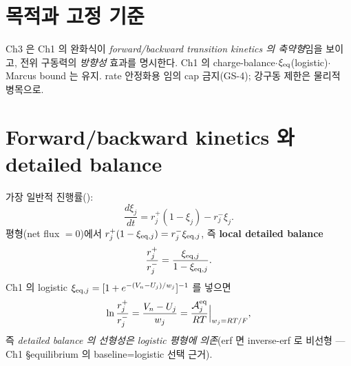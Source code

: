 \section{목적과 고정 기준}\label{sec:ch3_scope}
Ch3 은 Ch1 의 완화식이 \emph{forward/backward transition kinetics 의 축약형}임을 보이고, 전위
구동력의 \emph{방향성} 효과를 명시한다. Ch1 의 charge-balance$\cdot$$\xi_{\mathrm{eq}}$(logistic)$\cdot$
Marcus bound 는 유지. rate 안정화용 임의 cap 금지(GS-4); 강구동 제한은 물리적 병목으로.

\section{Forward/backward kinetics 와 detailed balance}\label{sec:ch3_fb}
가장 일반적 진행률():
\begin{equation}
\frac{d\xi_j}{dt}=r_j^+(1-\xi_j)-r_j^-\xi_j .
\label{eq:ch3_fb}
\end{equation}
평형(net flux $=0$)에서 $r_j^+(1-\xi_{\mathrm{eq},j})=r_j^-\xi_{\mathrm{eq},j}$, 즉 \textbf{local detailed balance}
\begin{equation}
\frac{r_j^+}{r_j^-}=\frac{\xi_{\mathrm{eq},j}}{1-\xi_{\mathrm{eq},j}} .
\label{eq:ch3_db}
\end{equation}
Ch1 의 logistic $\xi_{\mathrm{eq},j}=[1+e^{-(V_n-U_j)/w_j}]^{-1}$ 를 넣으면
\begin{equation}
\ln\frac{r_j^+}{r_j^-}=\frac{V_n-U_j}{w_j}=\frac{\mathcal A_j^{\mathrm{eq}}}{RT}\Big|_{w_j=RT/F},
\label{eq:ch3_dbwidth}
\end{equation}
즉 \emph{detailed balance 의 선형성은 logistic 평형에 의존}(erf 면 inverse-erf 로 비선형 — Ch1
\S equilibrium 의 baseline=logistic 선택 근거).

